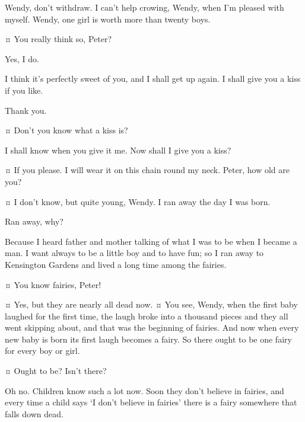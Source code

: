 \begin{drama}

\peterspeaks
Wendy, don’t withdraw.
I can’t help crowing, Wendy, when I’m pleased with myself.
Wendy, one girl is worth more than twenty boys.

\wendyspeaks {}¤
You really think so, Peter?

\peterspeaks
Yes, I do.

\wendyspeaks
I think it’s perfectly sweet of you, and I shall get up again.
I shall give you a kiss if you like.

\peterspeaks
Thank you.

\wendyspeaks {}¤
Don’t you know what a kiss is?

\peterspeaks
I shall know when you give it me.
Now shall I give you a kiss?

\wendyspeaks {}¤
If you please.
I will wear it on this chain round my neck.
Peter, how old are you?

\peterspeaks {}¤
I don’t know, but quite young, Wendy.
I ran away the day I was born.

\wendyspeaks
Ran away, why?

\peterspeaks
Because I heard father and mother talking of what I was to be when I became a man.
I want always to be a little boy and to have fun;
so I ran away to Kensington Gardens and lived a long time among the fairies.

\wendyspeaks {}¤
You know fairies, Peter!

\peterspeaks {}¤
Yes, but they are nearly all dead now.
¤
You see, Wendy, when the first baby laughed for the first time,
the laugh broke into a thousand pieces and they all went skipping about,
and that was the beginning of fairies.
And now when every new baby is born its first laugh becomes a fairy.
So there ought to be one fairy for every boy or girl.

\wendyspeaks {}¤
Ought to be?
Isn’t there?

\peterspeaks
Oh no.
Children know such a lot now.
Soon they don’t believe in fairies,
and every time a child says ‘I don’t believe in fairies’ there is a fairy somewhere that falls down dead.


\end{drama}
